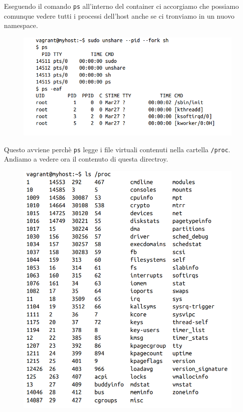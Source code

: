 Eseguendo il comando \verb|ps| all'interno del container ci accorgiamo che
possiamo comunque vedere tutti i processi dell'host anche se ci tronviamo
in un nuovo namespace.

\begin{figure}[H]
    \centering
    \includegraphics[width=12cm, keepaspectratio]{capitoli/os_security/imgs/pid5.png}
\end{figure}

Questo avviene perchè \verb|ps| legge i file virtuali contenuti nella cartella
\verb|/proc|. Andiamo a vedere ora il contenuto di questa directroy.

\begin{figure}[H]
    \centering
    \includegraphics[width=12cm, keepaspectratio]{capitoli/os_security/imgs/pid6.png}
\end{figure}

